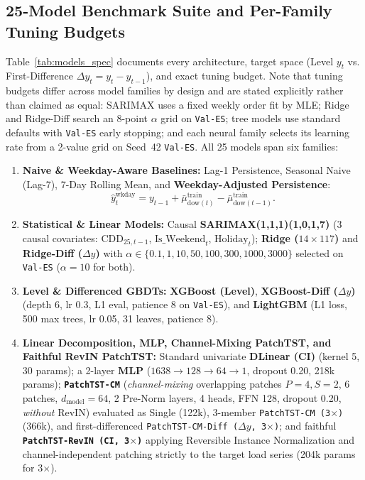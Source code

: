 \documentclass[5p,twocolumn,authoryear]{elsarticle}
\begin{document}
\subsection{25-Model Benchmark Suite and Per-Family Tuning Budgets}
Table~\ref{tab:models_spec} documents every architecture, target space (Level $y_t$ vs. First-Difference $\Delta y_t = y_t - y_{t-1}$), and exact tuning budget. Note that tuning budgets differ across model families by design and are stated explicitly rather than claimed as equal: SARIMAX uses a fixed weekly order fit by MLE; Ridge and Ridge-Diff search an 8-point $\alpha$ grid on \texttt{Val-ES}; tree models use standard defaults with \texttt{Val-ES} early stopping; and each neural family selects its learning rate from a 2-value grid on Seed~42 \texttt{Val-ES}. All 25 models span six families:
\begin{enumerate}
    \item \textbf{Naive \& Weekday-Aware Baselines:} Lag-1 Persistence, Seasonal Naive (Lag-7), 7-Day Rolling Mean, and \textbf{Weekday-Adjusted Persistence}:
    \begin{equation}
        \hat{y}_t^{\text{wkday}} = y_{t-1} + \bar{\mu}_{\text{dow}(t)}^{\text{train}} - \bar{\mu}_{\text{dow}(t-1)}^{\text{train}}.
    \end{equation}
    \item \textbf{Statistical \& Linear Models:} Causal \textbf{SARIMAX(1,1,1)(1,0,1,7)} (3 causal covariates: $\text{CDD}_{25,t-1}$, $\text{Is\_Weekend}_t$, $\text{Holiday}_t$); \textbf{Ridge ($14 \times 117$)} and \textbf{Ridge-Diff ($\Delta y$)} with $\alpha \in \{0.1, 1, 10, 50, 100, 300, 1000, 3000\}$ selected on \texttt{Val-ES} ($\alpha = 10$ for both).
    \item \textbf{Level \& Differenced GBDTs:} \textbf{XGBoost (Level)}, \textbf{XGBoost-Diff ($\Delta y$)} (depth 6, lr 0.3, L1 eval, patience 8 on \texttt{Val-ES}), and \textbf{LightGBM} (L1 loss, 500 max trees, lr 0.05, 31 leaves, patience 8).
    \item \textbf{Linear Decomposition, MLP, Channel-Mixing PatchTST, and Faithful RevIN PatchTST:} Standard univariate \textbf{DLinear (CI)} \citep{zeng2023dlinear} (kernel 5, 30 params); a 2-layer \textbf{MLP} ($1638 \to 128 \to 64 \to 1$, dropout 0.20, 218k params); \textbf{\texttt{PatchTST-CM}} (\textit{channel-mixing} overlapping patches $P=4, S=2$, 6 patches, $d_{\text{model}}=64$, 2 Pre-Norm layers, 4 heads, FFN 128, dropout 0.20, \textit{without} RevIN) evaluated as Single (122k), 3-member \texttt{PatchTST-CM (3$\times$)} (366k), and first-differenced \texttt{PatchTST-CM-Diff ($\Delta y$, 3$\times$)}; and faithful \textbf{\texttt{PatchTST-RevIN (CI, 3$\times$)}} \citep{nie2023patchtst,kim2022revin} applying Reversible Instance Normalization and channel-independent patching strictly to the target load series (204k params for 3$\times$).

\end{enumerate}
\end{document}
